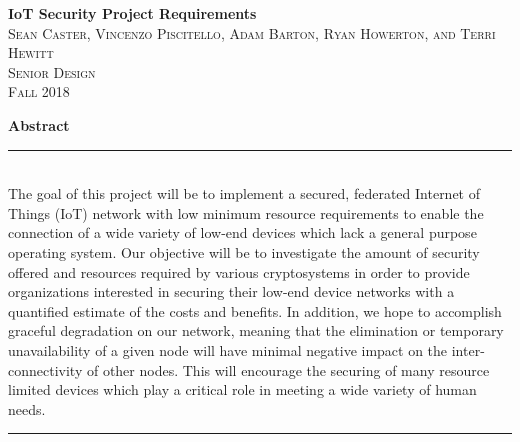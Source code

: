 \documentclass[tikz,a4paper,titlepage]{article}
\begin{document}
\begin{titlepage}
\vspace*{\fill}

\newcommand{\HRule}{\rule{\linewidth}{0.5mm}} %

\center %


{ \huge \bfseries IoT Security Project Requirements}\\[0.4cm] %


\textsc{\LARGE Sean Caster, Vincenzo Piscitello, Adam Barton, Ryan Howerton, and Terri Hewitt}\\[0.5cm] %
\textsc{\Large Senior Design}\\[0.5cm] %
\textsc{\large Fall 2018}\\[2.5cm] %


\begin{minipage}{0.8\textwidth}  %
\textbf{\large Abstract} \\
\HRule \\[0.4cm]
The goal of this project will be to implement a secured, federated Internet of Things (IoT) network with low minimum resource requirements to enable the connection of a wide variety of low-end devices which lack a general purpose operating system. Our objective will be to investigate the amount of security offered and resources required by various cryptosystems in order to provide organizations interested in securing their low-end device networks with a quantified estimate of the costs and benefits. In addition, we hope to accomplish graceful degradation on our network, meaning that the elimination or temporary unavailability of a given node will have minimal negative impact on the inter-connectivity of other nodes. This will encourage the securing of many resource limited devices which play a critical role in meeting a wide variety of human needs.
\\[0.4cm]
\HRule \\[1.5cm]
\end{minipage}


\end{titlepage}
\end{document}
